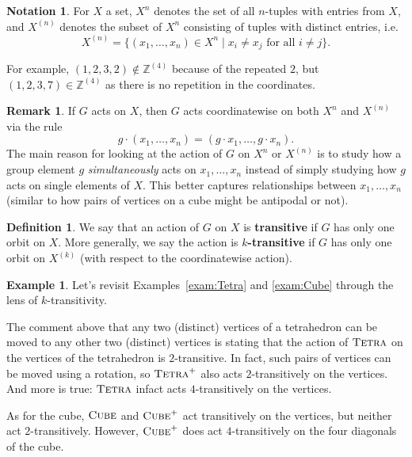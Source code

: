 \documentclass[11pt]{amsart}
\theoremstyle{plain}
\theoremstyle{definition}
\newtheorem*{definition*}{Definition}
\newtheorem{example}{Example}
\newtheorem*{remark*}{Remark}
\newtheorem*{notation}{Notation}
\theoremstyle{remark}
\newcommand{\symtetra}{\textsc{Tetra}}
\newcommand{\rsymtetra}{\textsc{Tetra}^+}
\newcommand{\symcube}{\textsc{Cube}}
\newcommand{\rsymcube}{\textsc{Cube}^+}
\begin{document}
\begin{notation}
For $X$ a set, $X^n$ denotes the set of all $n$-tuples with entries from $X$, and $X^{(n)}$ denotes the subset of $X^n$ consisting of tuples with distinct entries, i.e. \[X^{(n)} = \{(x_1,\ldots,x_n) \in X^n \mid \text{$x_i \neq x_j$ for all $i\neq j$}\}.\]
\end{notation}

For example, $(1,2,3,2)\notin \mathbb{Z}^{(4)}$ because of the repeated $2$, but $(1,2,3,7)\in \mathbb{Z}^{(4)}$ as there is no repetition in the coordinates. 

\begin{remark*}
If $G$ acts on $X$, then $G$ acts coordinatewise on both $X^{n}$ and $X^{(n)}$ via the rule \[g\cdot(x_1,\ldots,x_n) = (g\cdot x_1,\ldots,g\cdot x_n).\] 
The main reason for looking at the action of $G$ on $X^{n}$ or $X^{(n)}$ is to study how a group element $g$ \emph{simultaneously} acts on $x_1,\ldots,x_n$ instead of simply studying how $g$ acts on single elements of $X$. This better captures relationships between $x_1,\ldots,x_n$ (similar to how pairs of vertices on a cube might be antipodal or not). 
\end{remark*}

\begin{definition*}
We say that an action of $G$ on $X$ is \textbf{transitive} if $G$ has only one orbit on $X$. More generally, we say the action is \textbf{$k$-transitive} if $G$ has only one orbit on $X^{(k)}$ (with respect to the coordinatewise action).
\end{definition*}

\begin{example}
Let's revisit Examples~\ref{exam:Tetra} and \ref{exam:Cube} through the lens of $k$-transitivity. 

The comment above that any two  (distinct) vertices of a tetrahedron can be moved to any other two (distinct) vertices is stating that the action of $\symtetra$ on the vertices of  the tetrahedron is $2$-transitive. In fact, such pairs of vertices can be moved using a rotation, so $\rsymtetra$ also acts $2$-transitively on the vertices. And more is true: $\symtetra$ infact acts $4$-transitively on the vertices. 

As for the cube, $\symcube$ and $\rsymcube$ act transitively on the vertices, but neither act $2$-transitively. However, $\rsymcube$ does act $4$-transitively on the four diagonals of the cube. 
\end{example}
\end{document}
